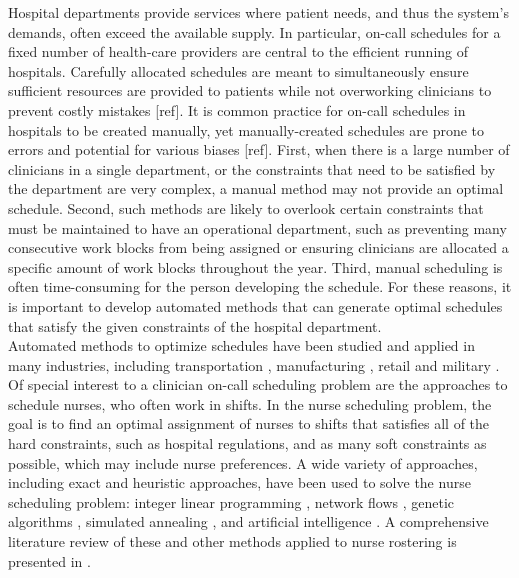 Hospital departments provide services where patient needs, and thus the system's demands, often exceed the available supply. In particular, on-call schedules for a fixed number of health-care providers are central to the efficient running of hospitals. Carefully allocated schedules are meant to simultaneously ensure sufficient resources are provided to patients while not overworking clinicians to prevent costly mistakes [ref]. It is common practice for on-call schedules in hospitals to be created manually, yet manually-created schedules are prone to errors and potential for various biases [ref]. First, when there is a large number of clinicians in a single department, or the constraints that need to be satisfied by the department are very complex, a manual method may not provide an optimal schedule. Second, such methods are likely to overlook certain constraints that must be maintained to have an operational department, such as preventing many consecutive work blocks from being assigned or ensuring clinicians are allocated a specific amount of work blocks throughout the year. Third, manual scheduling is often time-consuming for the person developing the schedule. For these reasons, it is important to develop automated methods that can generate optimal schedules that satisfy the given constraints of the hospital department. \\

Automated methods to optimize schedules have been studied and applied in many industries, including transportation \cite{aickelin_improved_2006, goel_truck_2012, gunther_combined_2010}, manufacturing \cite{al-yakoob_mixed-integer_2007, al-yakoob_column_2008, alfares_simulation_2007}, retail \cite{chapados_retail_2011, nissen_automatic_2010} and military \cite{horn_scheduling_2007, laguna_modeling_2005}. Of special interest to a clinician on-call scheduling problem are the approaches to schedule nurses, who often work in shifts. In the nurse scheduling problem, the goal is to find an optimal assignment of nurses to shifts that satisfies all of the hard constraints, such as hospital regulations, and as many soft constraints as possible, which may include nurse preferences. A wide variety of approaches, including exact and heuristic approaches, have been used to solve the nurse scheduling problem: integer linear programming \cite{azaiez_0-1_2005, trilling_nurse_2006, widyastiti_nurses_2016}, network flows \cite{el_adoly_new_2018}, genetic algorithms \cite{aickelin_exploiting_2000, jan_evolutionary_2000, kawanaka_genetic_2001}, simulated annealing \cite{jaszkiewicz_metaheuristic_1997}, and artificial intelligence \cite{abdennadher_nurse_nodate, li_hybrid_2003}. A comprehensive literature review of these and other methods applied to nurse rostering is presented in \cite{burke_state_2004}. \\

